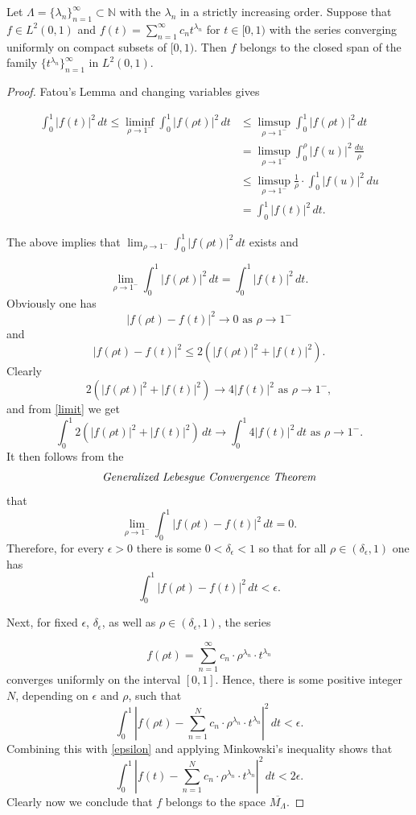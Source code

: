 \documentclass[10pt,a4paper]{amsart}
\begin{document}
\begin{lemma}\label{converse}
Let $\Lambda=\{\lambda_n\}_{n=1}^{\infty}\subset\mathbb{N}$ with the $\lambda_n$ in a strictly increasing order.
Suppose that $f\in L^2 (0,1)$ and $f(t)=\sum_{n=1}^{\infty} c_n t^{\lambda_n}$ for $t\in [0,1)$ with the series converging uniformly on compact
subsets of $[0, 1)$. Then $f$ belongs to the closed span of the family $\{t^{\lambda_n}\}_{n=1}^{\infty}$ in $L^2 (0,1)$.
\end{lemma}

\begin{proof}

Fatou's Lemma and changing variables gives

\begin{align*}
\int_{0}^{1}|f(t)|^2\,dt\le \liminf_{\rho\to 1^-}\int_{0}^{1}|f(\rho t)|^2\,dt & \le
\limsup_{\rho\to 1^-}\int_{0}^{1}|f(\rho t)|^2\,dt \\
 & =  \limsup_{\rho\to 1^-}\int_{0}^{\rho}|f(u)|^2\, \frac{du}{\rho}\\ & \le
\limsup_{\rho\to 1^-}\frac{1}{\rho}\cdot \int_{0}^{1}|f(u)|^2\, du \\ & =
\int_{0}^{1}|f(t)|^2\,dt.
\end{align*}

The above implies that $\lim_{\rho\to 1^-}\int_{0}^{1}|f(\rho t)|^2\,dt$ exists and

\begin{equation}\label{limit}
\lim_{\rho\to 1^-}\int_{0}^{1}|f(\rho t)|^2\, dt = \int_{0}^{1}|f(t)|^2\, dt.
\end{equation}
Obviously one has
\[
|f(\rho t)-f(t)|^2\to 0\,\,\text{as}\,\, \rho\to 1^-
\]
and
\[
|f(\rho t)-f(t)|^2\le 2(|f(\rho t)|^2 + |f(t)|^2).
\]
Clearly
\[
2(|f(\rho t)|^2 + |f(t)|^2)\to 4|f(t)|^2\,\,\text{as}\,\, \rho\to 1^-,
\]
and from \eqref{limit} we get
\[
\int_{0}^{1} 2(|f(\rho t)|^2 + |f(t)|^2)\, dt \to \int_{0}^{1} 4|f(t)|^2\, dt \,\,\text{as}\,\, \rho\to 1^-.
\]
It then follows from the
\[
\text{\it{Generalized Lebesgue Convergence Theorem}}
\]
that
\[
\lim_{\rho\to 1^-}\int_{0}^{1}|f(\rho t)-f(t)|^2\, dt = 0.
\]
Therefore, for every $\epsilon>0$ there is some $0<\delta_{\epsilon}<1$ so that for all $\rho\in (\delta_{\epsilon}, 1)$ one has
\begin{equation}\label{epsilon}
\int_{0}^{1}|f(\rho t)-f(t)|^2\, dt < \epsilon.
\end{equation}

Next, for fixed $\epsilon$, $\delta_{\epsilon}$, as well as $\rho \in (\delta_{\epsilon}, 1)$, the series

\[
f(\rho t) = \sum_{n=1}^{\infty} c_{n} \cdot \rho^{\lambda_n}\cdot t^{\lambda_n}
\]
converges uniformly on the interval $[0,1]$. Hence, there is some positive integer $N$, depending on $\epsilon$ and $\rho$, such that
\[
\int_{0}^{1}\left| f(\rho t) - \sum_{n=1}^{N} c_{n} \cdot \rho^{\lambda_n}\cdot t^{\lambda_n}\right|^2\, dt<\epsilon.
\]
Combining this with \eqref{epsilon} and applying Minkowski's inequality shows that
\[
\int_{0}^{1}\left| f(t) - \sum_{n=1}^{N} c_{n} \cdot \rho^{\lambda_n}\cdot t^{\lambda_n}\right|^2\, dt<2\epsilon.
\]
Clearly now we conclude that $f$ belongs to the space $\overline{M_{\Lambda}}$.
\end{proof}
\end{document}
